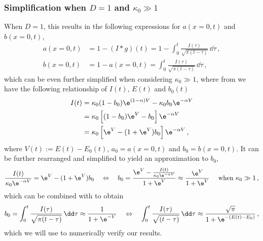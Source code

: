 \documentclass{prettytex/ox/mmsc-special-topic}
\begin{document}
  \subsubsection{Simplification when $D = 1$ and $\kappa_0 \gg 1$}
  When $D = 1$, this results in the following expressions for $a(x=0, t)$ and $b(x=0, t)$,
  \begin{align}
    \label{eq:laplace-a} a(x=0, t) & = 1 - (I * g)(t) = 1 - \int_{0}^{t} \frac{I(\tau)}{\sqrt{\pi (t - \tau)}} \,\dd\tau\,, \\
    \label{eq:laplace-b} b(x=0, t) & = 1 - a(x=0, t) = \int_{0}^{t} \frac{I(\tau)}{\sqrt{\pi (t - \tau)}} \,\dd\tau\,,
  \end{align}
  which can be even further simplified when considering $\kappa_0 \gg 1$, where from  we have the following relationship of $I(t)$, $E(t)$ and $b_0(t)$
  \begin{align*}
    I(t) & = \kappa_0 (1-b_0) \e^{(1-\alpha) V} - \kappa_0 b_0 \e^{-\alpha V} \\
         & = \kappa_0 \left[(1-b_0) \e^V - b_0\right] \e^{-\alpha V}          \\
         & = \kappa_0 \left[\e^V - (1+\e^V) b_0\right] \e^{-\alpha V}\,,
  \end{align*}
  where $V(t) := E(t) - E_0(t)$, $a_0 = a(x=0, t)$ and $b_0 = b(x=0, t)$.
  It can be further rearranged and simplified to yield an approximation to $b_0$,
  \begin{align*}
    \frac{I(t)}{\kappa_0 \e^{-\alpha V}} = \e^V - (1+\e^V) b_0 \quad \Leftrightarrow \quad
    b_0 = \frac{\e^V - \frac{I(t)}{\kappa_0 \e^{-\alpha V}}}{1+\e^V} \approx \frac{\e^V}{1 + \e^V} \quad \text{ when } \kappa_0 \gg 1\,,
  \end{align*}
  which can be combined with  to obtain
  \begin{equation}
    b_0 = \int_{0}^{t} \frac{I(\tau)}{\sqrt{\pi (t - \tau)}} \,\dd\tau \approx \frac{1}{1+\e^{-V}} \quad \Leftrightarrow \quad \int_{0}^{t} \frac{I(\tau)}{\sqrt{(t - \tau)}} \,\dd\tau \approx \frac{\sqrt{\pi}}{1 + \e^{-(E(t) - E_0)}}\,,
    \label{eq:numerical-verification}
  \end{equation}
  which we will use to numerically verify our results.
\end{document}
